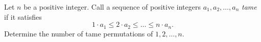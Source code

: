 Let $n$ be a positive integer.
Call a sequence of positive integers $a_1, a_2, \ldots , a_n$ \emph{tame} if it satisfies
$$1 \cdot a_1 \leq 2\cdot a_2\leq  \ldots \leq n \cdot a_n.$$
Determine the number of tame permutations of $1,2, \ldots, n$.
